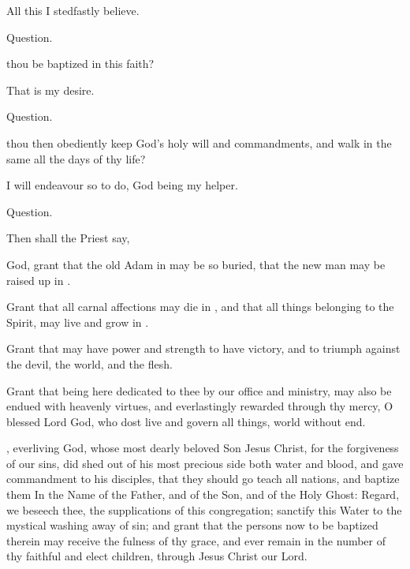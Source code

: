  All this I stedfastly believe.

\begin{center}
Question.
\end{center}

 thou be baptized in this faith?

 That is my desire.

\begin{center}
Question.
\end{center}

 thou then obediently keep God's holy will and commandments, and walk in the same all the days of thy life?

 I will endeavour so to do, God being my helper.

\begin{center}
Question.
\end{center}

\begin{rubric}
Then shall the Priest say,
\end{rubric}

 God, grant that the old Adam in  may be so buried, that the new man may be raised up in .

Grant that all carnal affections may die in , and that all things belonging to the Spirit, may live and grow in .

Grant that  may have power and strength to have victory, and to triumph against the devil, the world, and the flesh.

Grant that  being here dedicated to thee by our office and ministry, may also be endued with heavenly virtues, and everlastingly rewarded through thy mercy, O blessed Lord God, who dost live and govern all things, world without end.

, everliving God, whose most dearly beloved Son Jesus Christ, for the forgiveness of our sins, did shed out of his most precious side both water and blood, and gave commandment to his disciples, that they should go teach all nations, and baptize them In the Name of the Father, and of the Son, and of the Holy Ghost: Regard, we beseech thee, the supplications of this congregation; sanctify this Water to the mystical washing away of sin; and grant that the persons now to be baptized therein may receive the fulness of thy grace, and ever remain in the number of thy faithful and elect children, through Jesus Christ our Lord.


